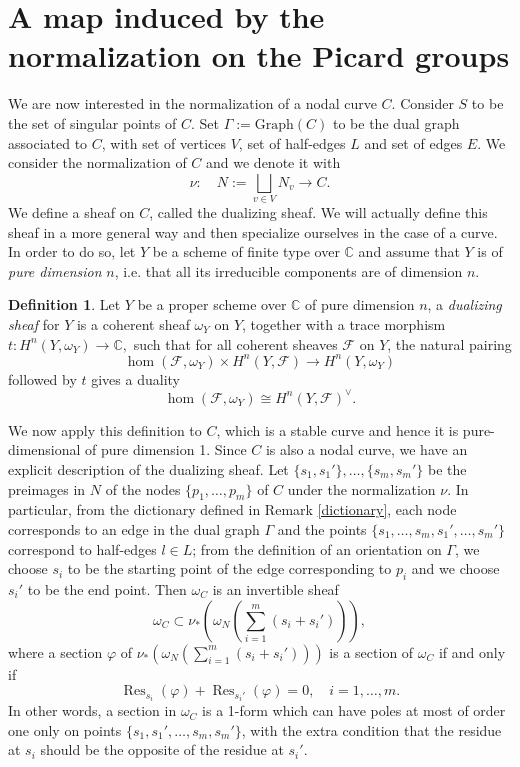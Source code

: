\documentclass[a4paper,12 pt,titlepage,twoside]{book}
\newcommand{\numberset}{\mathbb}
\newcommand{\C}{\numberset{C}}
\DeclareMathOperator{\res}{Res}
\theoremstyle{plain}
\theoremstyle{theorem}
\theoremstyle{definition}
\newtheorem{defn}[thm]{Definition}
\theoremstyle{remark}
\begin{document}
	\section{A map induced by the normalization on the Picard groups}
	We are now interested in the normalization of a nodal curve $C$. Consider $S$ to be the set of singular points of $C$. Set $\Gamma := \text{Graph}(C)$ to be the dual graph associated to $C$, with set of vertices $V$, set of half-edges $L$ and set of edges $E$. We consider the normalization of $C$ and we denote it with $$\nu \colon \quad N:=\bigsqcup_{v \in V} N_v \rightarrow C.$$ 
	We define a sheaf on $C$, called the dualizing sheaf. We will actually define this sheaf in a more general way and then specialize ourselves in the case of a curve. In order to do so, let $Y$ be a scheme of finite type over $\C$ and assume that $Y$ is of \emph{pure dimension} $n$, i.e. that all its irreducible components are of dimension $n$.
	\begin{defn}
		Let $Y$ be a proper scheme over $\C$ of pure dimension $n$, a \emph{dualizing sheaf} for $Y$ is a coherent sheaf $\omega_Y$ on $Y$, together with a trace morphism $t \colon H^n(Y,\omega_Y) \rightarrow \C,$ such that for all coherent sheaves $\mathcal{F}$ on $Y$, the natural pairing $$\hom (\mathcal{F}, \omega_Y) \times H^n(Y,\mathcal{F}) \rightarrow H^n(Y,\omega_Y)$$ followed by $t$ gives a duality $$\hom(\mathcal{F}, \omega_Y) \cong H^n(Y,\mathcal{F})^\vee.$$
	\end{defn}
	We now apply this definition to $C$, which is a stable curve and hence it is pure-dimensional of pure dimension 1. Since $C$ is also a nodal curve, we have an explicit description of the dualizing sheaf. Let $\{s_1, s_1'\}, \dots, \{s_m,s_m'\}$ be the preimages in $N$ of the nodes $\{p_1, \dots, p_m\}$ of $C$ under the normalization $\nu.$ In particular, from the dictionary defined in Remark \ref{dictionary}, each node corresponds to an edge in the dual graph $\Gamma$ and the points $\{s_1, \dots, s_m, s_1', \dots, s_m'\}$ correspond to half-edges $l \in L$; from the definition of an orientation on $\Gamma$, we choose $s_i$ to be the starting point of the edge corresponding to $p_i$ and we choose $s_i'$ to be the end point. Then $\omega_C$ is an invertible sheaf $$\omega_C \subset \nu_*\left(\omega_N\left(\sum_{i=1}^m(s_i + s_i')\right)\right),$$ where a section $\varphi$ of $\nu_*\left(\omega_N\left(\sum_{i=1}^m(s_i + s_i')\right)\right)$ is a section of $\omega_C$ if and only if $$\res_{s_i}(\varphi) + \res_{s_i'}(\varphi) = 0, \quad i = 1, \dots, m.$$ In other words, a section in $\omega_C$ is a 1-form which can have poles at most of order one only on points $\{s_1,s_1', \dots, s_m,s_m'\}$, with the extra condition that the residue at $s_i$ should be the opposite of the residue at $s_i'$.
\end{document}
